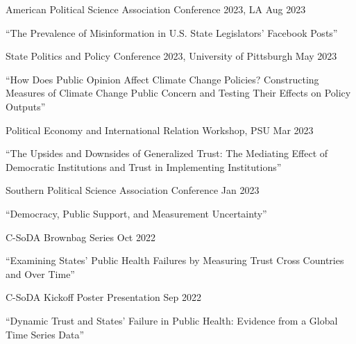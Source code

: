 \documentclass[10.5pt,]{article}
\providecommand{\tightlist}{%
	\setlength{\itemsep}{0pt}\setlength{\parskip}{0pt}}
\renewenvironment{itemize}{
	\begin{list}{}{
			\setlength{\leftmargin}{1.5em}
		}
	}{
	\end{list}
}
\begin{document}
\begin{itemize}
  \begin{itemize}
  \tightlist
  \item
    American Political Science Association Conference 2023, LA
    \hfill Aug 2023
  \end{itemize}
\item
  ``The Prevalence of Misinformation in U.S. State Legislators' Facebook
  Posts''

  \begin{itemize}
  \tightlist
  \item
    State Politics and Policy Conference 2023, University of Pittsburgh
    \hfill May 2023
  \end{itemize}
\item
  ``How Does Public Opinion Affect Climate Change Policies? Constructing
  Measures of Climate Change Public Concern and Testing Their Effects on
  Policy Outputs''

  \begin{itemize}
  \tightlist
  \item
    Political Economy and International Relation Workshop, PSU
    \hfill Mar 2023
  \end{itemize}
\item
  ``The Upsides and Downsides of Generalized Trust: The Mediating Effect
  of Democratic Institutions and Trust in Implementing Institutions''

  \begin{itemize}
  \tightlist
  \item
    Southern Political Science Association Conference \hfill Jan 2023
  \end{itemize}
\item
  ``Democracy, Public Support, and Measurement Uncertainty''

  \begin{itemize}
  \tightlist
  \item
    C-SoDA Brownbag Series \hfill Oct 2022
  \end{itemize}
\item
  ``Examining States' Public Health Failures by Measuring Trust Cross
  Countries and Over Time''

  \begin{itemize}
  \tightlist
  \item
    C-SoDA Kickoff Poster Presentation \hfill Sep 2022
  \end{itemize}
\item
  ``Dynamic Trust and States' Failure in Public Health: Evidence from a
  Global Time Series Data''


\end{itemize}
\end{document}
